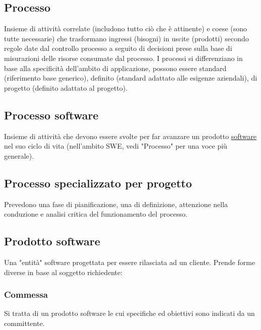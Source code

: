 	\subsection{Processo}
	\label{sec:processi}
	Insieme di attività correlate (includono tutto ciò che è attinente) e coese (sono tutte necessarie) che trasformano ingressi (bisogni) in uscite (prodotti) secondo regole date dal controllo processo a seguito di decisioni prese sulla base di misurazioni delle risorse consumate dal processo.
	I processi si differenziano in base alla specificità dell'ambito di applicazione, possono essere standard (riferimento base generico), definito (standard adattato alle esigenze aziendali), di progetto (definito adattato al progetto).

	\subsection{Processo software}
	\label{sec:processisoftware}
	Insieme di attività che devono essere svolte per far avanzare un prodotto \underline{\hyperref[sec:prodottosoftware]{software}} nel suo ciclo di vita (nell'ambito SWE, vedi "Processo" per una voce più generale).

	\subsection{Processo specializzato per progetto}
	\label{sec:processispecializzati}
	Prevedono una fase di pianificazione, una di definizione, attenzione nella conduzione e analisi critica del funzionamento del processo.

	\subsection{Prodotto software}
	\label{sec:prodottosoftware}
	Una "entità" software progettata per essere rilasciata ad un cliente.
	Prende forme diverse in base al soggetto richiedente:

		\subsubsection{Commessa}
		Si tratta di un prodotto software le cui specifiche ed obiettivi sono indicati da un committente.

